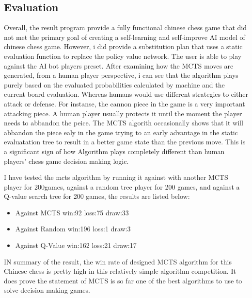 \documentclass[10pt,twocolumn]{article}
\begin{document}
\subsection{Evaluation}
    Overall, the result program provide a fully functional chinese chess game that did not met the primary goal of creating a self-learning and self-improve AI model of chinese chess game. However, i did provide a substitution plan that uses a static evaluation function to replace the policy value network. The user is able to play against the AI bot players preset. 
    After examining how the MCTS moves are generated, from a human player perspective, i can see that the algorithm plays purely based on the evaluated probabilities calculated by machine and the current board evaluation. Whereas humans would use different strategies to either attack or defense. For instanse, the cannon piece in the game is a very important attacking piece. A human player usually protects it until the moment the player needs to abbandon the peice. The MCTS algorith occasionally shows that it will abbandon the piece ealy in the game trying to an early advantage in the static evaluatation tree to result in a better game state than the previous move. This is a significant sign of how Algorithm plays completely different than human players' chess game decision making logic. 

    I have tested the mcts algorithm by running it against with another MCTS player for 200games, against a random tree player for 200 games, and against a Q-value search tree for 200 games, the results are listed below:
    \begin{itemize}
        \item Against MCTS win:92 loss:75 draw:33
        \item Against Random win:196 loss:1 draw:3
        \item Against Q-Value win:162 loss:21 draw:17
    \end{itemize}
    IN summary of the result, the win rate of designed MCTS algorithm for this Chinese chess is pretty high in this relatively simple algorithm competition. It does prove the statement of MCTS is so far one of the best algorithms to use to solve decision making games. 
    
\end{document}

